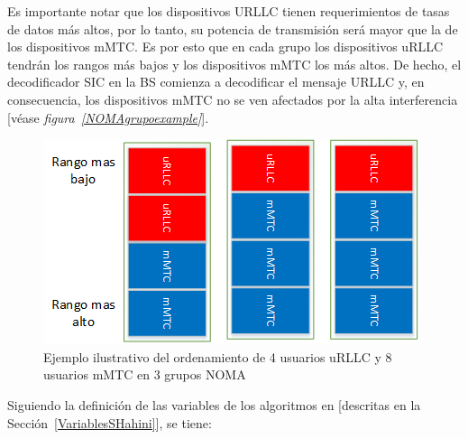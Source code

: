 Es importante notar que los dispositivos URLLC tienen requerimientos de tasas de datos más altos, por lo tanto, su potencia de transmisión será mayor que la de los dispositivos mMTC. Es por esto que en cada grupo los dispositivos uRLLC tendrán los rangos más bajos y los dispositivos mMTC los más altos. De hecho, el decodificador SIC en la BS comienza a decodificar el mensaje URLLC y, en consecuencia, los dispositivos mMTC no se ven afectados por la alta interferencia [véase \textit{figura~\ref{NOMAgrupoexample}}].\newline




\begin{figure}[th]
    \centering
    \includegraphics[scale=.8]{Figures/EjemploNOMAclusters}
    \decoRule
    \caption[Ejemplo ilustrativo del ordenamiento de usuarios en los grupos NOMA]{Ejemplo ilustrativo del ordenamiento de 4 usuarios uRLLC y 8 usuarios mMTC en 3 grupos NOMA}
    \label{fig:NOMAgrupoexample}
\end{figure}






Siguiendo la definición de las variables de los algoritmos en \parencite{Shahini2019} [descritas en la Sección~\ref{VariablesSHahini}], se tiene:\newline

\makeatletter
\def\algbackskip{\hskip-\ALG@thistlm}
\makeatother

